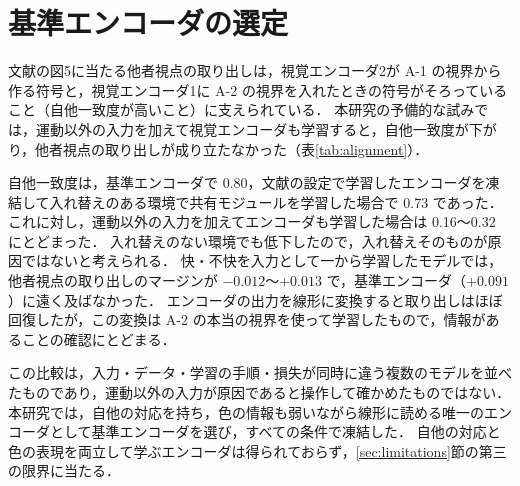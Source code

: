 \section{基準エンコーダの選定}\label{app:encoder}
文献\cite{noguchi2022superposition}の図5に当たる他者視点の取り出しは，視覚エンコーダ2が A-1 の視界から作る符号と，視覚エンコーダ1に A-2 の視界を入れたときの符号がそろっていること（自他一致度が高いこと）に支えられている．
本研究の予備的な試みでは，運動以外の入力を加えて視覚エンコーダも学習すると，自他一致度が下がり，他者視点の取り出しが成り立たなかった（表\ref{tab:alignment}）．

\begin{table}[t]
  \centering
  \small
  \caption{視覚エンコーダの扱いと自他一致度}
  \label{tab:alignment}
  
\end{table}

自他一致度は，基準エンコーダで 0.80，文献\cite{noguchi2022superposition}の設定で学習したエンコーダを凍結して入れ替えのある環境で共有モジュールを学習した場合で 0.73 であった．
これに対し，運動以外の入力を加えてエンコーダも学習した場合は 0.16〜0.32 にとどまった．
入れ替えのない環境でも低下したので，入れ替えそのものが原因ではないと考えられる．
快・不快を入力として一から学習したモデルでは，他者視点の取り出しのマージンが $-0.012$〜$+0.013$ で，基準エンコーダ（$+0.091$）に遠く及ばなかった．
エンコーダの出力を線形に変換すると取り出しはほぼ回復したが，この変換は A-2 の本当の視界を使って学習したもので，情報があることの確認にとどまる．

この比較は，入力・データ・学習の手順・損失が同時に違う複数のモデルを並べたものであり，運動以外の入力が原因であると操作して確かめたものではない．
本研究では，自他の対応を持ち，色の情報も弱いながら線形に読める唯一のエンコーダとして基準エンコーダを選び，すべての条件で凍結した．
自他の対応と色の表現を両立して学ぶエンコーダは得られておらず，\ref{sec:limitations}節の第三の限界に当たる．

